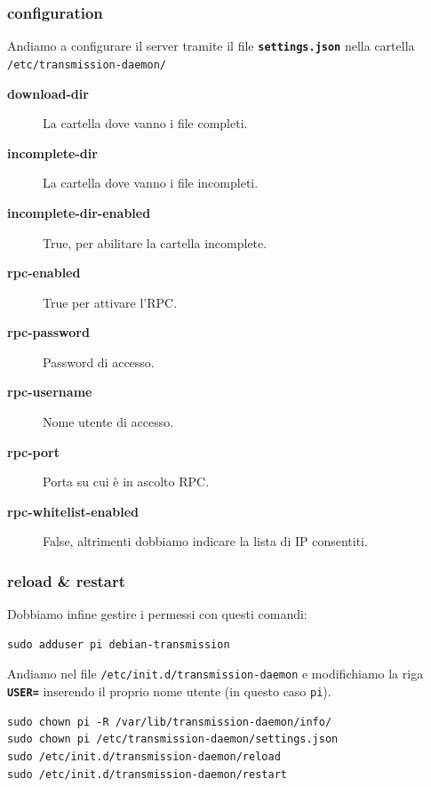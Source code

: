 \documentclass[xcolor=svgnames,11pt]{beamer}
\begin{document}
\begin{frame}[fragile]\frametitle{configuration}
Andiamo a configurare il server tramite il file \textbf{\texttt{settings.json}} nella cartella \texttt{/etc/transmission-daemon/}
\medskip
\begin{footnotesize}
\begin{description}
  \item[\textbf{download-dir}] La cartella dove vanno i file completi.
  \item[\textbf{incomplete-dir}] La cartella dove vanno i file incompleti.
  \item[\textbf{incomplete-dir-enabled}] True, per abilitare la cartella incomplete.
  \item[\textbf{rpc-enabled}] True per attivare l'RPC.
  \item[\textbf{rpc-password}] Password di accesso.
  \item[\textbf{rpc-username}] Nome utente di accesso.
  \item[\textbf{rpc-port}] Porta su cui \`e in ascolto RPC.
  \item[\textbf{rpc-whitelist-enabled}] False, altrimenti dobbiamo indicare la lista di IP consentiti.
\end{description}
\end{footnotesize}
\end{frame}

\begin{frame}[fragile]\frametitle{reload \& restart}
Dobbiamo infine gestire i permessi con questi comandi:
\begin{block}{}
\begin{verbatim}
sudo adduser pi debian-transmission
\end{verbatim}
\end{block}
\medskip
Andiamo nel file \texttt{/etc/init.d/transmission-daemon} e modifichiamo la riga \texttt{\textbf{USER=}} inserendo il proprio nome utente (in questo caso \texttt{pi}).
\medskip
\begin{block}{}
\begin{small}
\begin{verbatim}
sudo chown pi -R /var/lib/transmission-daemon/info/
sudo chown pi /etc/transmission-daemon/settings.json
sudo /etc/init.d/transmission-daemon/reload
sudo /etc/init.d/transmission-daemon/restart
\end{verbatim}
\end{small}
\end{block}
\end{frame}
\end{document}
